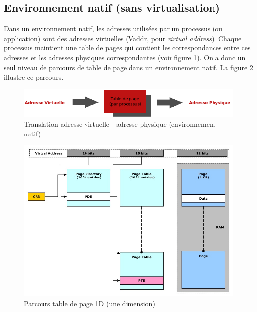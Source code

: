 \subsection{Environnement natif (sans virtualisation)}
Dans un environnement natif, les adresses utilisées par un processus (ou application) sont des adresses virtuelles (Vaddr, pour \textit{virtual address}). Chaque processus maintient une table de pages qui contient les correspondances entre ces adresses et les adresses physiques correspondantes (voir figure \ref{fig:vaddr_paddr_natif}). On a donc un seul niveau de parcours de table de page dans un environnement natif. La figure \ref{fig:parcours_1D} illustre ce parcours.
\begin{figure}[htp]
    \centering
    \includegraphics[scale=.65]{chapters/1/fig1/vaddr_paddr}
    \caption{Translation adresse virtuelle - adresse physique (environnement natif)}
    \label{fig:vaddr_paddr_natif}
\end{figure}

\begin{figure}[htp]
    \centering
    \includegraphics[scale=.55]{chapters/1/fig1/parcours_1D}
    \caption{Parcours table de page 1D (une dimension)}
    \label{fig:parcours_1D}
\end{figure}

